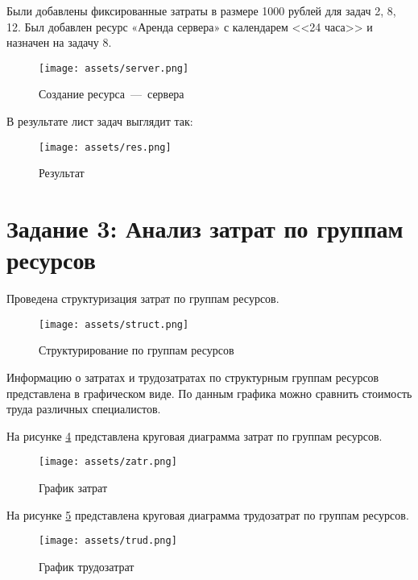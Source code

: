 Были добавлены фиксированные затраты в размере 1000 рублей для задач 2, 8, 12. Был добавлен ресурс «Аренда сервера» с календарем <<24 часа>> и назначен на задачу 8.

\begin{figure}[H]
    \begin{center}
    \texttt{[image: assets/server.png]}
    \caption{Создание ресурса~---~сервера}
    \label{fig:2}
    \end{center}
\end{figure}

В результате лист задач выглядит так:

\begin{figure}[H]
    \begin{center}
    \texttt{[image: assets/res.png]}
    \caption{Результат}
    \label{fig:2}
    \end{center}
\end{figure}

\newpage

\section{Задание 3: Анализ затрат по группам ресурсов}

Проведена структуризация затрат по группам ресурсов.

\begin{figure}[H]
    \begin{center}
    \texttt{[image: assets/struct.png]}
    \caption{Структурирование по группам ресурсов}
    \label{fig:2}
    \end{center}
\end{figure}

Информацию о затратах и трудозатратах по структурным группам ресурсов представлена в графическом виде. По данным графика можно сравнить стоимость труда различных специалистов.

\newpage

На рисунке \ref{fig:zatraty} представлена круговая диаграмма затрат по группам ресурсов.

\begin{figure}[H]
    \begin{center}
    \texttt{[image: assets/zatr.png]}
    \caption{График затрат}
    \label{fig:zatraty}
    \end{center}
\end{figure}

На рисунке \ref{fig:trud} представлена круговая диаграмма трудозатрат по группам ресурсов.


\begin{figure}[H]
    \begin{center}
    \texttt{[image: assets/trud.png]}
    \caption{График трудозатрат}
    \label{fig:trud}
    \end{center}
\end{figure}


